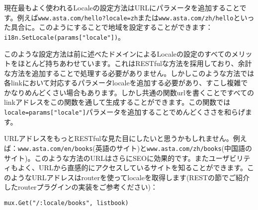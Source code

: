 現在最もよく使われるLocaleの設定方法はURLにパラメータを追加することです。例えば\texttt{www.asta.com/hello?locale=zh}または\texttt{www.asta.com/zh/hello}といった具合に。このようにすることで地域を設定することができます：\texttt{i18n.SetLocale(params["locale"])}。

このような設定方法は前に述べたドメインによるLocaleの設定のすべてのメリットをほとんど持ちあわせています。これはRESTfulな方法を採用しており、余計な方法を追加することで処理する必要がありません。しかしこのような方法では各linkにおいて対応するパラメータlocaleを追加する必要があり、すこし複雑でかなりめんどくさい場合もあります。しかし共通の関数urlを書くことですべてのlinkアドレスをこの関数を通して生成することができます。この関数では\texttt{locale=params["locale"]}パラメータを追加することでめんどくささを和らげます。

URLアドレスをもっとRESTfulな見た目にしたいと思うかもしれません。例えば：\texttt{www.asta.com/en/books}(英語のサイト)と\texttt{www.asta.com/zh/books}(中国語のサイト)。このような方法のURLはさらにSEOに効果的です。またユーザビリティもよく、URLから直感的にアクセスしているサイトを知ることができます。このようなURLアドレスはrouterを使ってlocaleを取得します(RESTの節でご紹介したrouterプラグインの実装をご参考ください)：


\begin{lstlisting}[numbers=none]
mux.Get("/:locale/books", listbook)
\end{lstlisting}
